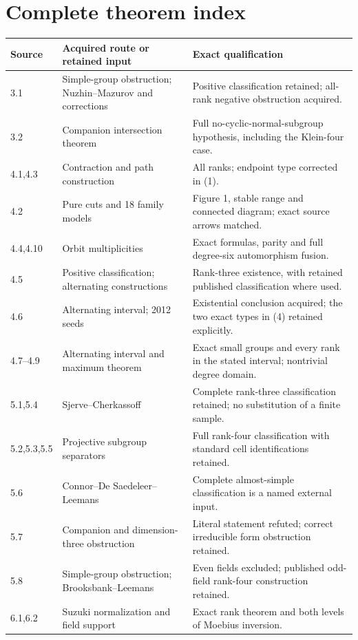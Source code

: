 \documentclass[11pt]{article}
\begin{document}
\section*{Complete theorem index}
\small
\begin{longtable}{@{}p{17mm}p{45mm}p{91mm}@{}}
\toprule Source & Acquired route or retained input & Exact qualification\\\midrule\endhead
3.1 & Simple-group obstruction; Nuzhin--Mazurov and corrections & Positive classification retained; all-rank negative obstruction acquired.\\
3.2 & Companion intersection theorem & Full no-cyclic-normal-subgroup hypothesis, including the Klein-four case.\\
4.1,4.3 & Contraction and path construction & All ranks; endpoint type corrected in (1).\\
4.2 & Pure cuts and 18 family models & Figure 1, stable range and connected diagram; exact source arrows matched.\\
4.4,4.10 & Orbit multiplicities & Exact formulas, parity and full degree-six automorphism fusion.\\
4.5 & Positive classification; alternating constructions & Rank-three existence, with retained published classification where used.\\
4.6 & Alternating interval; 2012 seeds & Existential conclusion acquired; the two exact types in (4) retained explicitly.\\
4.7--4.9 & Alternating interval and maximum theorem & Exact small groups and every rank in the stated interval; nontrivial degree domain.\\
5.1,5.4 & Sjerve--Cherkassoff & Complete rank-three classification retained; no substitution of a finite sample.\\
5.2,5.3,5.5 & Projective subgroup separators & Full rank-four classification with standard cell identifications retained.\\
5.6 & Connor--De Saedeleer--Leemans & Complete almost-simple classification is a named external input.\\
5.7 & Companion and dimension-three obstruction & Literal statement refuted; correct irreducible form obstruction retained.\\
5.8 & Simple-group obstruction; Brooksbank--Leemans & Even fields excluded; published odd-field rank-four construction retained.\\
6.1,6.2 & Suzuki normalization and field support & Exact rank theorem and both levels of Moebius inversion.\\

\end{longtable}
\end{document}
